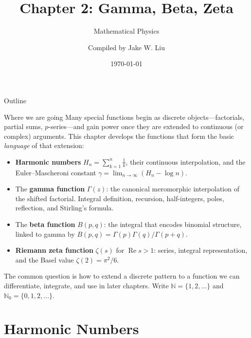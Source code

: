 \documentclass[11pt]{beamer}
\author[]{Compiled by Jake W. Liu}
\title[Gamma, Beta, Zeta]{Chapter 2: Gamma, Beta, Zeta}
\subtitle{Mathematical Physics}
\date{\today}
\begin{document}
\setcounter{sfchapter}{2}
\renewcommand{\thesection}{\arabic{sfchapter}.\arabic{section}}

\begin{frame}[c]\titlepage
\end{frame}

\begin{frame}{Outline}
\tableofcontents
\end{frame}

\begin{frame}{Where we are going}
\footnotesize
Many special functions begin as discrete objects---factorials, partial sums,
\(p\)-series---and gain power once they are extended to continuous (or complex)
arguments. This chapter develops the functions that form the basic
\emph{language} of that extension:
\begin{itemize}
  \item \textbf{Harmonic numbers} \(H_n=\sum_{k=1}^n\tfrac1k\), their continuous interpolation, and the
        Euler--Mascheroni constant \(\gamma=\lim_{n\to\infty}(H_n-\log n)\).
  \item The \textbf{gamma function} \(\Gamma(z)\): the canonical meromorphic
        interpolation of the shifted factorial. Integral definition, recursion,
        half-integers, poles, reflection, and Stirling's formula.
  \item The \textbf{beta function} \(B(p,q)\): the integral that encodes binomial
        structure, linked to gamma by \(B(p,q)=\Gamma(p)\Gamma(q)/\Gamma(p+q)\).
  \item \textbf{Riemann zeta function}
        \(\zeta(s)\) for \(\operatorname{Re}s>1\): series, integral representation,
        and the Basel value \(\zeta(2)=\pi^2/6\).
\end{itemize}
The common question is how to extend a discrete pattern to a function we can
differentiate, integrate, and use in later chapters. Write \(\mathbb N=\{1,2,\dots\}\) and \(\mathbb N_0=\{0,1,2,\dots\}\).
\end{frame}


\section{Harmonic Numbers}
\end{document}
